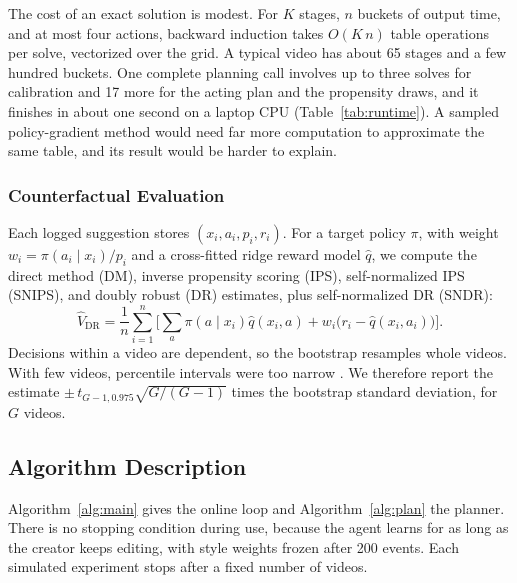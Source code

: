 \documentclass{ieeeaccess}
\begin{document}
The cost of an exact solution is modest. For $K$ stages, $n$ buckets of output time, and at most four actions, backward induction takes $O(K\,n)$ table operations per solve, vectorized over the grid. A typical video has about 65 stages and a few hundred buckets. One complete planning call involves up to three solves for calibration and 17 more for the acting plan and the propensity draws, and it finishes in about one second on a laptop CPU (Table~\ref{tab:runtime}). A sampled policy-gradient method would need far more computation to approximate the same table, and its result would be harder to explain.

\subsubsection{Counterfactual Evaluation}
Each logged suggestion stores $(x_i,a_i,p_i,r_i)$. For a target policy $\pi$, with weight $w_i=\pi(a_i\mid x_i)/p_i$ and a cross-fitted ridge reward model $\hat q$, we compute the direct method (DM), inverse propensity scoring (IPS), self-normalized IPS (SNIPS), and doubly robust (DR) estimates, plus self-normalized DR (SNDR):
\begin{equation}
\hat V_{\mathrm{DR}} = \frac{1}{n}\sum_{i=1}^{n}\Big[\sum_a \pi(a\mid x_i)\hat q(x_i,a) + w_i\big(r_i-\hat q(x_i,a_i)\big)\Big]. \label{eq:dr}
\end{equation}
Decisions within a video are dependent, so the bootstrap resamples whole videos. With few videos, percentile intervals were too narrow \cite{cameron2008}. We therefore report the estimate $\pm\, t_{G-1,0.975}\sqrt{G/(G-1)}$ times the bootstrap standard deviation, for $G$ videos.

\subsection{Algorithm Description}
Algorithm~\ref{alg:main} gives the online loop and Algorithm~\ref{alg:plan} the planner. There is no stopping condition during use, because the agent learns for as long as the creator keeps editing, with style weights frozen after 200 events. Each simulated experiment stops after a fixed number of videos.
\end{document}
